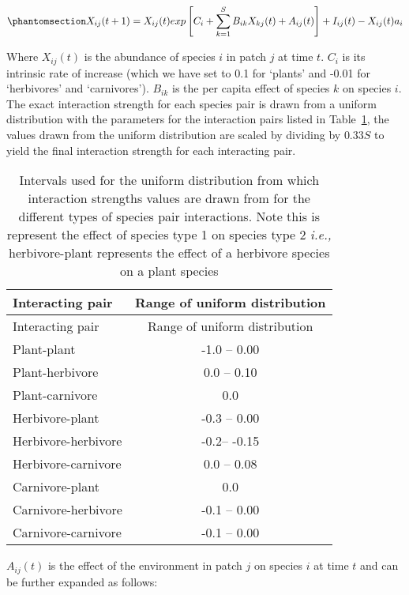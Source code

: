 \documentclass[
]{agujournal2019}
\begin{document}
\begin{equation}\phantomsection\label{eq-metacomm}{
X_{ij}(t+1)=X_{ij}(t)exp\left[C_{i} + \sum_{k=1}^{S}B_{ik}X_{kj}(t)+A_{ij}(t)\right]+I_{ij}(t)-X_{ij}(t)a_{i}
}\end{equation}

Where \(X_{ij}(t)\) is the abundance of species \(i\) in patch \(j\) at
time \(t\). \(C_i\) is its intrinsic rate of increase (which we have set
to 0.1 for `plants' and -0.01 for `herbivores' and `carnivores').
\(B_{ik}\) is the per capita effect of species \(k\) on species \(i\).
The exact interaction strength for each species pair is drawn from a
uniform distribution with the parameters for the interaction pairs
listed in Table~\ref{tbl-interaction_strength}, the values drawn from
the uniform distribution are scaled by dividing by \(0.33S\) to yield
the final interaction strength for each interacting pair.

\begin{longtable}[]{@{}lc@{}}
\caption{Intervals used for the uniform distribution from which
interaction strengths values are drawn from for the different types of
species pair interactions. Note this is represent the effect of species
type 1 on species type 2 \emph{i.e.,} herbivore-plant represents the
effect of a herbivore species on a plant
species}\label{tbl-interaction_strength}\tabularnewline
\toprule\noalign{}
Interacting pair & Range of uniform distribution \\
\midrule\noalign{}
\endfirsthead
\toprule\noalign{}
Interacting pair & Range of uniform distribution \\
\midrule\noalign{}
\endhead
\bottomrule\noalign{}
\endlastfoot
Plant-plant & -1.0 -- 0.00 \\
Plant-herbivore & 0.0 -- 0.10 \\
Plant-carnivore & 0.0 \\
Herbivore-plant & -0.3 -- 0.00 \\
Herbivore-herbivore & -0.2-- -0.15 \\
Herbivore-carnivore & 0.0 -- 0.08 \\
Carnivore-plant & 0.0 \\
Carnivore-herbivore & -0.1 -- 0.00 \\
Carnivore-carnivore & -0.1 -- 0.00 \\
\end{longtable}

\(A_{ij}(t)\) is the effect of the environment in patch \(j\) on species
\(i\) at time \(t\) and can be further expanded as follows:
\end{document}
